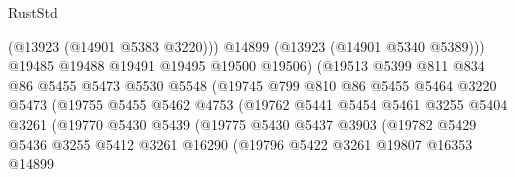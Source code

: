 \begin{lexlean}{RustStd}
\begin{coremodule}
                                      (@13923 (@14901 @5383 @3220)))
                                    @14899
                                    (@13923 (@14901 @5340 @5389)))
                                  @19485
                                  @19488
                                  @19491
                                  @19495
                                  @19500
                                  @19506)
                                (@19513
                                  @5399
                                  @811
                                  @834
                                  @86
                                  @5455
                                  @5473
                                  @5530
                                  @5548
                                  (@19745
                                    @799
                                    @810
                                    @86
                                    @5455
                                    @5464
                                    @3220
                                    @5473
                                    (@19755
                                      @5455
                                      @5462
                                      @4753
                                      (@19762
                                        @5441
                                        @5454
                                        @5461
                                        @3255
                                        @5404
                                        @3261
                                        (@19770
                                          @5430
                                          @5439
                                          (@19775
                                            @5430
                                            @5437
                                            @3903
                                            (@19782
                                              @5429
                                              @5436
                                              @3255
                                              @5412
                                              @3261
                                              @16290
                                              (@19796
                                                @5422
                                                @3261
                                                @19807
                                                @16353
                                                @14899

\end{coremodule}
\end{lexlean}
